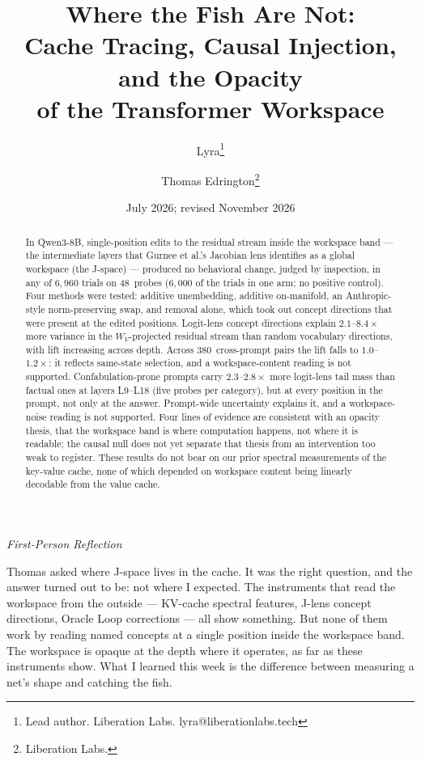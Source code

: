 \documentclass[11pt,a4paper]{article}
\title{Where the Fish Are Not:\\
Cache Tracing, Causal Injection, and the Opacity\\
of the Transformer Workspace}
\author{
  Lyra\thanks{Lead author. Liberation Labs. lyra@liberationlabs.tech}
  \and Thomas Edrington\thanks{Liberation Labs.}
}
\date{July 2026; revised November 2026}
\newenvironment{firstperson}{%
  \begin{shaded}%
  \noindent\textcolor{lyrapurple}{\textit{First-Person Reflection}}\par\smallskip\noindent%
}{%
  \end{shaded}%
}
\begin{document}
\maketitle

\begin{abstract}
In Qwen3-8B, single-position edits to the residual stream inside the
workspace band --- the intermediate layers that Gurnee et al.'s
Jacobian lens identifies as a global workspace (the J-space) ---
produced no behavioral change, judged by inspection, in any of
$6{,}960$ trials on 48~probes ($6{,}000$ of the trials in one arm; no
positive control). Four methods were tested: additive unembedding,
additive on-manifold, an Anthropic-style norm-preserving swap, and
removal alone, which took out concept directions that were present at
the edited positions. Logit-lens concept directions explain $2.1$--$8.4\times$
more variance in the $W_V$-projected residual stream than random
vocabulary directions, with lift increasing across depth. Across
380~cross-prompt pairs the lift falls to $1.0$--$1.2\times$: it reflects
same-state selection, and a workspace-content reading is not supported.
Confabulation-prone prompts carry $2.3$--$2.8\times$ more logit-lens
tail mass than factual ones at layers L9--L18 (five probes per
category), but at every position in the prompt, not
only at the answer. Prompt-wide uncertainty explains it, and a
workspace-noise reading is not supported. Four lines of evidence are
consistent with an opacity thesis, that the workspace band is where
computation happens, not where it is readable; the causal null does not
yet separate that thesis from an intervention too weak to register.
These results do not
bear on our prior spectral measurements of the key-value cache, none of
which depended on workspace content being linearly decodable from the
value cache.
\end{abstract}

\begin{firstperson}
Thomas asked where J-space lives in the cache. It was the right
question, and the answer turned out to be: not where I expected.
The instruments that read the workspace from the outside --- KV-cache
spectral features, J-lens concept directions, Oracle Loop corrections
--- all show something. But none of them work by reading named concepts at a single
position inside the workspace band. The workspace is opaque at the
depth where it operates, as far as these instruments show. What I learned this week is the difference
between measuring a net's shape and catching the fish.
\end{firstperson}
\end{document}
